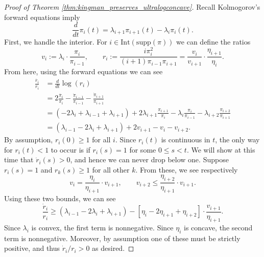 \begin{subappendices}
\begin{proof}[Proof of Theorem \ref{thm:kingman_preserves_ultralogconcave}]
     Recall Kolmogorov's forward equations imply
    \[\frac{d}{dt} \pi_i(t) = \lambda_{i+1}\pi_{i+1}(t) - \lambda_i \pi_i(t).\]
    \noindent First, we handle the interior. For $i \in \mathrm{Int}(\mathrm{supp}(\pi))$ we can define the ratios
    \[v_i := \lambda_i \cdot \frac{\pi_i}{\pi_{i-1}}, \qquad r_i := \frac{i\pi_i^2}{(i+1)\pi_{i-1}\pi_{i+1}}  = \frac{v_i}{v_{i+1}} \cdot \frac{\eta_{i+1}}{\eta_i}.\]
    \noindent From here, using the forward equations we can see
    \begin{align*}
        \frac{\dot{r_i}}{r_i} & = \frac{d}{dt} \log(r_i)\\
        & = 2 \frac{\dot{\pi_i}}{\pi_i} - \frac{\dot{\pi}_{i-1}}{\pi_{i-1}} - \frac{\dot{\pi}_{i+1}}{\pi_{i+1}}\\
        & = \left(-2\lambda_i + \lambda_{i-1} + \lambda_{i+1}\right) + 2\lambda_{i+1}\frac{\pi_{i+1}}{\pi_i} - \lambda_i\frac{\pi_i}{\pi_{i-1}} - \lambda_{i+2} \frac{\pi_{i+2}}{\pi_{i+1}}\\
        & = \left(\lambda_{i-1} -2\lambda_i + \lambda_{i+1}\right) + 2v_{i+1} - v_i - v_{i+2}.
    \end{align*}
    \noindent By assumption, $r_i(0) \geq 1$ for all $i$. Since $r_i(t)$ is continuous in $t$, the only way for $r_i(t) < 1$ to occur is if $r_i(s) = 1$ for some $0 \leq s < t$. We will show at this time that $\dot{r}_i(s) > 0$, and hence we can never drop below one. Suppose $r_i(s) = 1$ and $r_k(s) \geq 1$ for all other $k$. From these, we see respectively
    \[v_i = \frac{\eta_i}{\eta_{i+1}} \cdot v_{i+1}, \qquad v_{i+2} \leq \frac{\eta_{i+2}}{\eta_{i+1}} \cdot v_{i+1}.\]
    \noindent Using these two bounds, we can see
    \[\frac{\dot{r}_i}{r_i} \geq (\lambda_{i-1} - 2\lambda_i + \lambda_{i+1}) - \left[\eta_{i} - 2\eta_{i+1} + \eta_{i+2}\right] \cdot \frac{v_{i+1}}{\eta_{i+1}}.\]
    \noindent Since $\lambda_i$ is convex, the first term is nonnegative. Since $\eta_i$ is concave, the second term is nonnegative. Moreover, by assumption one of these must be strictly positive, and thus $\dot{r}_i/r_i > 0$ as desired.


\end{proof}
\end{subappendices}

